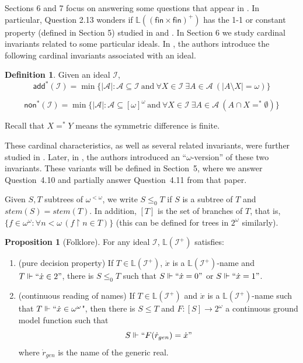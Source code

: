 \documentclass{amsart}
\theoremstyle{definition}
\newtheorem{definition}[theorem]{Definition}
\newtheorem{proposition}[theorem]{Proposition}
\theoremstyle{remark}
\numberwithin{equation}{section}
\newcommand{\fin}{\mathsf{fin}}
\newcommand{\add}{\mathsf{add}}
\newcommand{\non}{\mathsf{non}}
\newcommand{\li}{\mathbb{L}(\mathcal{I}^+)}
\newcommand{\lav}{\mathbb{L}}
\newcommand{\id}{\mathcal{I}}
\newcommand{\restr}[2]{#1\upharpoonright {#2}}
\begin{document}
Sections 6 and 7 focus on answering some questions that appear in \cite{poke}. In particular, Question 2.13 wonders if $\lav((\fin\times \fin)^+)$ has the 1-1 or constant property (defined in Section 5) studied in \cite{sabok} and \cite{poke}. In Section 6 we study cardinal invariants related to some particular ideals. In \cite{hernandez}, the authors introduce the following cardinal invariants associated with an ideal.

\begin{definition}
    Given an ideal $\id$,
    \[
    \add^*(\id)=\min\{ |\mathcal{A}| : \mathcal{A}\subseteq \id \ \text{and}\ \forall X\in \id \ \exists A\in \mathcal{A} \ (|A\setminus X|=\omega)\}
    \]

    \[
    \non^*(\id)= \min\{|\mathcal{A}| : \mathcal A \subseteq [\omega]^\omega \ \text{and}\ \forall X\in \id \ \exists A\in \mathcal{A} \ (A\cap X =^*\emptyset) \}
    \]
\end{definition}

Recall that $X=^*Y$ means the symmetric difference is finite.

These cardinal characteristics, as well as several related invariants, were further studied in \cite{hrusak}. Later, in \cite{poke}, the authors introduced an ``$\omega$-version'' of these two invariants. These variants will be defined in Section~5, where we answer Question~4.10 and partially answer Question~4.11 from that paper.


Given $S,T$ subtrees of $\omega^{<\omega}$, we write $S\leq_0 T$ if $S$ is a subtree of $T$ and $stem(S)=stem(T)$. In addition, $[T]$ is the set of branches of $T$, that is, $\{f\in \omega^{\omega}: \forall n<\omega\, (\restr{f}{n}\in T)\}$ (this can be defined for trees in $2^\omega$ similarly). 

\begin{proposition}[Folklore]
    For any ideal $\mathcal{I}$, $\li$ satisfies:
    \begin{enumerate}
        \item (pure decision property) If $T\in\li$, $\dot x$ is a $\li$-name and $T\Vdash`` \dot x\in 2"$, there is $S\leq_0 T$ such that $S\Vdash`` \dot x=0"$ or $S\Vdash`` \dot x=1"$.
        \item (continuous reading of names)
        If $T\in\li$ and $\dot x$ is a $\li$-name such that $T\Vdash`` \dot x \in\omega^\omega$", then there is $S\leq T$ and $F:[S]\rightarrow2^\omega$ a continuous ground model function such that \begin{displaymath}
        S \Vdash ``F(\dot r_{gen})= \dot x"
    \end{displaymath}
    where $\dot r_{gen}$ is the name of the generic real.
    \end{enumerate}
\end{proposition}
\end{document}
